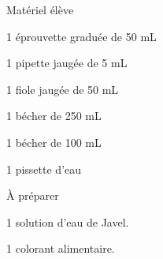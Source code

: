 
\begin{boiteMateriel}{Matériel élève}
  \effectifPremiereStss

  \begin{protocole}
    \item 1 éprouvette graduée de 50 mL
    \item 1 pipette jaugée de 5 mL
    \item 1 fiole jaugée de 50 mL
    \item 1 bécher de 250 mL
    \item 1 bécher de 100 mL
    \item 1 pissette d'eau
  \end{protocole}
\end{boiteMateriel}


\begin{boiteMateriel}{À préparer}
  \begin{protocole}
    \item 1 solution d'eau de Javel.
    \item 1 colorant alimentaire.
  \end{protocole}
\end{boiteMateriel}
